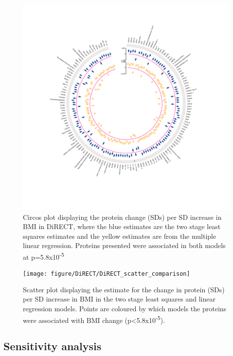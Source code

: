 \documentclass[11pt,twoside]{bristolthesis}
\newcommand{\blandscape}{\begin{landscape}}
\newcommand{\elandscape}{\end{landscape}}
\begin{document}
\begin{figure}
\includegraphics[width=1\linewidth]{figure/DiRECT/circos_plot_BMI_change_protein_ols_tsls} \caption[Circos plot of proteins associated with BMI change]{Circos plot displaying the protein change (SDs) per SD increase in BMI in DiRECT, where the blue estimates are the two stage least squares estimates and the yellow estimates are from the multiple linear regression. Proteins presented were associated in both models at p=5.8x10\textsuperscript{-5}}\label{fig:circos}
\end{figure}
\blandscape



\begin{figure}
\texttt{[image: figure/DiRECT/DiRECT\_scatter\_comparison]} \caption[Scatter plot comparing proteins association with BMI change across models in DiRECT]{Scatter plot displaying the estimate for the change in protein (SDs) per SD increase in BMI in the two stage least squares and linear regression models. Points are coloured by which models the proteins were associated with BMI change (p\textless5.8x10\textsuperscript{-5}).}\label{fig:scatter-DiRECT}
\end{figure}
\elandscape

\hypertarget{sensitivity-analysis}{%
\subsection{Sensitivity analysis}\label{sensitivity-analysis}}
\end{document}

